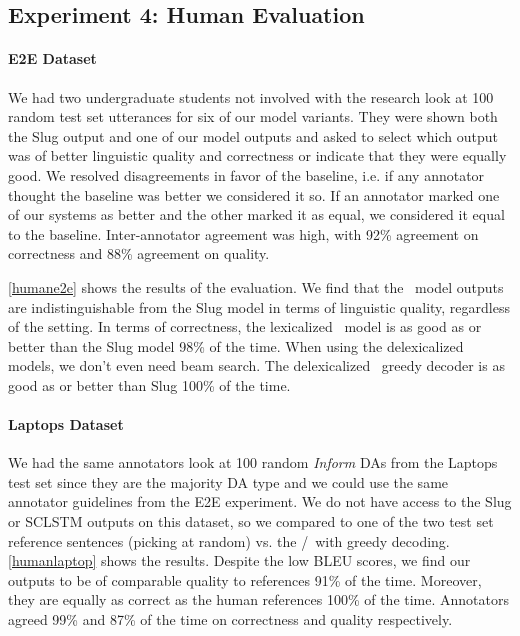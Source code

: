 \subsection{Experiment 4: Human Evaluation} 

\paragraph{E2E Dataset} We had two undergraduate students not involved with 
the research look at 100 random test set utterances for six
of our model variants. They were shown
both the Slug output and one of our model outputs and asked to select
which output was of better linguistic quality and correctness or 
indicate that they were equally good.
 We resolved disagreements in favor of the baseline,
i.e. if any annotator thought the baseline was better we considered it so.
If an annotator marked one of our 
systems as better and the other marked it as equal, we considered it 
equal to the baseline. Inter-annotator agreement was high, with 92\% agreement on correctness
and 88\% agreement on quality.

\autoref{humane2e} shows the results of the evaluation.
We find that the \auggen~model outputs are indistinguishable from the Slug
model in terms of linguistic quality, regardless of the setting.
In terms of correctness, the lexicalized \auggen~model is as good as or better than the Slug model 98\%
of the time. 
When using the delexicalized models, we don't even need beam search.
The delexicalized \auggen~greedy decoder is as good as or better 
than Slug 100\% of the time.

\paragraph{Laptops Dataset} We had the same annotators look at 100 random 
\textit{Inform}
DAs from the Laptops test set since they are the majority DA type and we 
could use the same annotator
guidelines from the E2E experiment. We do not have access to the Slug
or SCLSTM outputs on this dataset, so we compared to one of the two
test set reference sentences (picking at random) vs. 
the \auggen/~with greedy decoding. \autoref{humanlaptop}
shows the results. Despite the low BLEU scores, we find our outputs
to be of comparable quality to references 91\% of the time. Moreover,
they are equally as correct as the human references 100\% of the time.
Annotators agreed 99\% and 87\% of the time on correctness and quality 
respectively.

